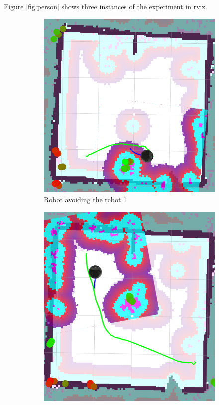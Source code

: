 Figure \ref{fig:person} shows three instances of the experiment in rviz.
\begin{figure}[ht!]
  \centering
  \begin{subfigure}[t]{0.3\linewidth}
    \includegraphics[width=\linewidth]{imgs/chapter5/robot1.png}
     \caption{Robot avoiding the robot 1}
     \label{fig::robot1}
  \end{subfigure}
  \begin{subfigure}[t]{0.3\linewidth}
    \includegraphics[width=\linewidth]{imgs/chapter5/robot2.png}

\end{subfigure}
\end{figure}
